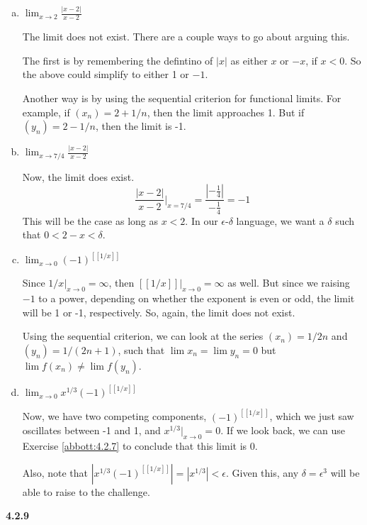 \begin{enumerate}[(a)]
\item $\lim_{x \rightarrow 2} \frac{|x-2|}{x-2}$

The limit does not exist.
There are a couple ways to go about arguing this.

The first is by remembering the defintino of $|x|$ as either $x$ or $-x$, if $x<0$.
So the above could simplify to either 1 or $-1$.

Another way is by using the sequential criterion for functional limits.
For example, if $(x_n) = 2 + 1/n$, then the limit approaches 1.
But if $(y_n) = 2 - 1/n$, then the limit is -1.

\item $\lim_{x \rightarrow 7/4} \frac{|x-2|}{x-2}$

Now, the limit does exist.
$$
\frac{|x-2|}{x-2} \Bigg|_{x=7/4} = \frac{\left|-\frac{1}{4}\right|}{-\frac{1}{4}} = -1
$$
This will be the case as long as $x<2$.
In our $\epsilon$-$\delta$ language, we want a $\delta$ such that $0 < 2-x < \delta$.

\item $\lim_{x \rightarrow 0} \left(-1\right)^{[[1/x]]}$

Since $1/x \big|_{x\rightarrow 0} = \infty$, then $[[1/x]] \big|_{x\rightarrow 0} = \infty$ as well.
But since we raising $-1$ to a power, depending on whether the exponent is even or odd, the limit will be 1 or -1, respectively.
So, again, the limit does not exist.

Using the sequential  criterion, we can look at the series $(x_n) = 1/2n$ and $(y_n) = 1/(2n+1)$, such that
$\lim x_n = \lim y_n = 0$ but $\lim f(x_n) \neq \lim f(y_n)$.


\item $\lim_{x \rightarrow 0} x^{1/3} \left(-1\right)^{[[1/x]]}$

Now, we have two competing components, $\left(-1\right)^{[[1/x]]}$, which we just saw oscillates between -1 and 1, and
$x^{1/3} \big|_{x\rightarrow 0} = 0$.
If we look back, we can use Exercise \ref{abbott:4.2.7} to conclude that this limit is 0.

Also, note that $| x^{1/3} \left(-1\right)^{[[1/x]]} | = | x^{1/3} | < \epsilon$.
Given this, any $\delta = \epsilon^3$ will be able to raise to the challenge.

\end{enumerate}



\textbf{4.2.9}
\\

